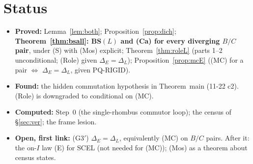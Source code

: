 \documentclass[11pt]{article}
\theoremstyle{definition}\newtheorem{definition}[theorem]{Definition}\newtheorem{remark}[theorem]{Remark}
\begin{document}
\section{Status}
\begin{itemize}
\item \textbf{Proved:} Lemma~\ref{lem:both}; Proposition~\ref{prop:dich}; \textbf{Theorem~\ref{thm:bsall}: BS$(L)$ and (Ca) for every diverging $B/C$ pair}, under (S) with (Mos) explicit; Theorem~\ref{thm:roleL} (parts 1--2 unconditional; (Role) given $\Delta_E=\Delta_L$); Proposition~\ref{prop:mcE} ((MC) for a pair $\iff$ $\Delta_E=\Delta_L$, given PQ-RIGID).
\item \textbf{Found:} the hidden commutation hypothesis in Theorem~main (11-22 c2). (Role) is downgraded to conditional on (MC).
\item \textbf{Computed:} Step~0 (the single-rhombus commutor loop); the census of \S\ref{sec:ver}; the frame lesion.
\item \textbf{Open, first link:} (G3$'$) $\Delta_E=\Delta_L$, equivalently (MC) on $B/C$ pairs. After it: the on-$I$ law (E) for SCEL (not needed for (MC)); (Mos) as a theorem about census states.
\end{itemize}
\end{document}
